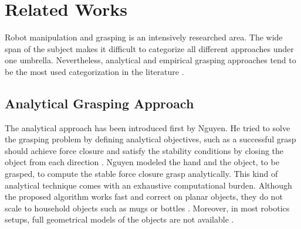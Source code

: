 \section{Related Works}


Robot manipulation and grasping is an intensively researched area. The wide span of the subject makes it difficult to categorize all different approaches under one umbrella. Nevertheless, analytical and empirical grasping approaches tend to be the most used categorization in the literature \cite{Sahbani2012}.  


\subsection{Analytical Grasping Approach}

The analytical approach has been introduced first by Nguyen. He tried to solve the grasping problem by defining analytical objectives, such as a successful grasp should achieve force closure and satisfy the stability conditions by closing the object from each direction \cite{Nguyen1987}. Nguyen modeled the hand and the object, to be grasped, to compute the stable force closure grasp analytically. This kind of analytical technique comes with an exhaustive computational burden. Although the proposed algorithm works fast and correct on planar objects, they do not scale to household objects such as mugs or bottles \cite{Sahbani2012}. Moreover, in most robotics setups, full geometrical models of the objects are not available \cite{Schmidt2018}. 

